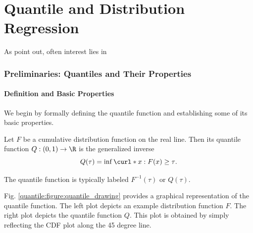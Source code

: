 \part{Quantile and Distribution Regression}
 
 As \cite{Heckman1997} point out, often interest lies in 
 
\section{Preliminaries: Quantiles and Their Properties}
 \label{quantile:section:quantile_properties}


\subsection{Definition and Basic Properties}
 
 We begin by formally defining the quantile function and establishing some of its basic properties.  
 \begin{dfn}
 	\label{quantile:definition:quantile_function}
 	Let $F$ be a cumulative distribution function on the real line. Then its quantile function $Q:(0, 1)\to \R$ is the generalized inverse
 	\begin{equation}
 		Q(\tau) = \inf\curl*{ x: F(x)\geq \tau }.
 	\end{equation}
 \end{dfn}
 The quantile function is typically labeled $F^{-1}(\tau)$ or $Q(\tau)$. 
 
 Fig. \ref{quantile:figure:quantile_drawing}  provides a graphical representation of the quantile function. The left plot depicts an example distribution function $F$. The right plot depicts the quantile function $Q$. This plot is obtained by simply reflecting the CDF plot along the 45 degree line. 
  
